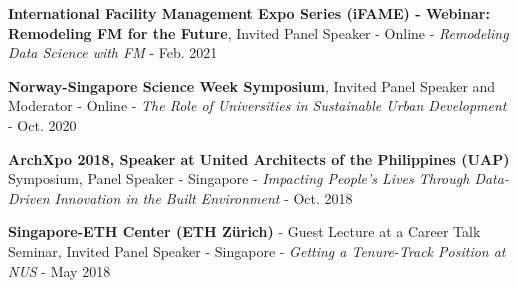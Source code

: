 \documentclass[10pt,a4paper]{article}
\begin{document}
\begin{small}
\begin{etaremune}
\textbf{International Facility Management Expo Series (iFAME) - Webinar: Remodeling FM for the Future}, Invited Panel Speaker - Online - \emph{Remodeling Data Science with FM} - Feb. 2021
\item
\textbf{Norway-Singapore Science Week Symposium}, Invited Panel Speaker and Moderator - Online - \emph{The Role of Universities in Sustainable Urban Development} - Oct. 2020
\item
\textbf{ArchXpo 2018, Speaker at United Architects of the Philippines (UAP)} Symposium, Panel Speaker - Singapore - \emph{Impacting People’s Lives Through Data-Driven Innovation in the Built Environment} - Oct. 2018
\item
\textbf{Singapore-ETH Center (ETH Z{\"u}rich)} - Guest Lecture at a Career Talk Seminar, Invited Panel Speaker - Singapore - \emph{Getting a Tenure-Track Position at NUS} - May 2018
\end{etaremune}



\end{small}
\end{document}
